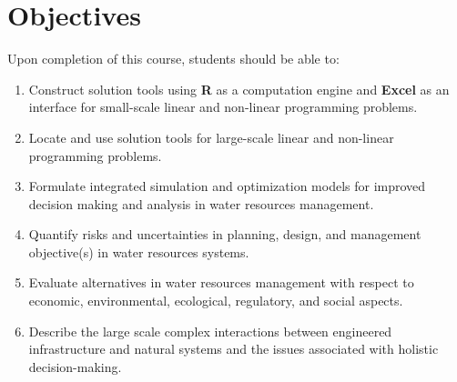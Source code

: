 \documentclass[12pt]{article}
\begin{document}
\section*{Objectives}
Upon completion of this course, students should be able to:
\begin{enumerate}
\item Construct solution tools using \textbf{R} as a computation engine and \textbf{Excel} as an interface for small-scale linear and non-linear programming problems.
\item Locate and use solution tools for large-scale linear and non-linear programming problems.
\item Formulate integrated simulation and optimization models for improved decision making and analysis in water resources management.
\item Quantify risks and uncertainties in planning, design, and management objective(s) in water resources systems. 
\item Evaluate alternatives in water resources management with respect to economic, environmental, ecological, regulatory, and social aspects. 
\item Describe the large scale complex interactions between engineered infrastructure and natural systems and the issues associated with holistic decision-making.
\end{enumerate}
\end{document}

